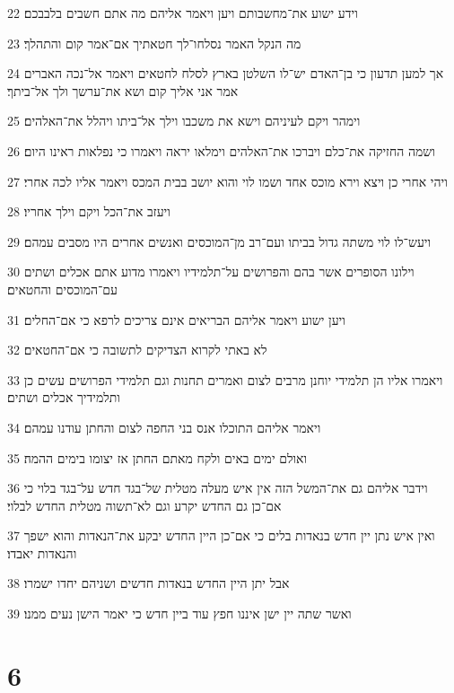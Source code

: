 \par 22 וידע ישוע את־מחשבותם ויען ויאמר אליהם מה אתם חשבים בלבבכם׃
\par 23 מה הנקל האמר נסלחו־לך חטאתיך אם־אמר קום והתהלך׃
\par 24 אך למען תדעון כי בן־האדם יש־לו השלטן בארץ לסלח לחטאים ויאמר אל־נכה האברים אמר אני אליך קום ושא את־ערשך ולך אל־ביתך׃
\par 25 וימהר ויקם לעיניהם וישא את משכבו וילך אל־ביתו ויהלל את־האלהים׃
\par 26 ושמה החזיקה את־כלם ויברכו את־האלהים וימלאו יראה ויאמרו כי נפלאות ראינו היום׃
\par 27 ויהי אחרי כן ויצא וירא מוכס אחד ושמו לוי והוא יושב בבית המכס ויאמר אליו לכה אחרי׃
\par 28 ויעזב את־הכל ויקם וילך אחריו׃
\par 29 ויעש־לו לוי משתה גדול בביתו ועם־רב מן־המוכסים ואנשים אחרים היו מסבים עמהם׃
\par 30 וילונו הסופרים אשר בהם והפרושים על־תלמידיו ויאמרו מדוע אתם אכלים ושתים עם־המוכסים והחטאים׃
\par 31 ויען ישוע ויאמר אליהם הבריאים אינם צריכים לרפא כי אם־החלים׃
\par 32 לא באתי לקרוא הצדיקים לתשובה כי אם־החטאים׃
\par 33 ויאמרו אליו הן תלמידי יוחנן מרבים לצום ואמרים תחנות וגם תלמידי הפרושים עשים כן ותלמידיך אכלים ושתים׃
\par 34 ויאמר אליהם התוכלו אנס בני החפה לצום והחתן עודנו עמהם׃
\par 35 ואולם ימים באים ולקח מאתם החתן אז יצומו בימים ההמה׃
\par 36 וידבר אליהם גם את־המשל הזה אין איש מעלה מטלית של־בגד חדש על־בגד בלוי כי אם־כן גם החדש יקרע וגם לא־תשוה מטלית החדש לבלוי׃
\par 37 ואין איש נתן יין חדש בנאדות בלים כי אם־כן היין החדש יבקע את־הנאדות והוא ישפך והנאדות יאבדו׃
\par 38 אבל יתן היין החדש בנאדות חדשים ושניהם יחדו ישמרו׃
\par 39 ואשר שתה יין ישן איננו חפץ עוד ביין חדש כי יאמר הישן נעים ממנו׃

\chapter{6}

